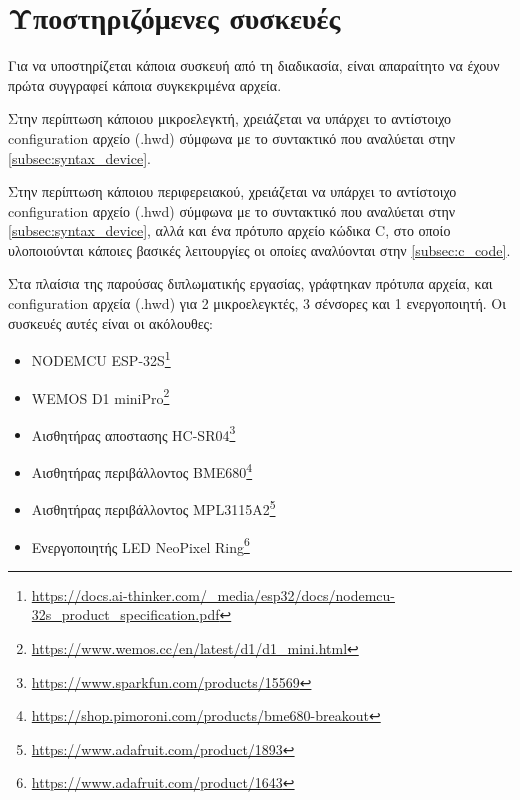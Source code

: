 \section{Υποστηριζόμενες συσκευές}
\label{sec:supported}

Για να υποστηρίζεται κάποια συσκευή από τη διαδικασία, είναι απαραίτητο να έχουν πρώτα συγγραφεί κάποια συγκεκριμένα αρχεία.

Στην περίπτωση κάποιου μικροελεγκτή, χρειάζεται να υπάρχει το αντίστοιχο configuration αρχείο (.hwd) σύμφωνα με το συντακτικό  που αναλύεται στην \autoref{subsec:syntax_device}.

Στην περίπτωση κάποιου περιφερειακού, χρειάζεται να υπάρχει το αντίστοιχο configuration αρχείο (.hwd) σύμφωνα με το συντακτικό  που αναλύεται στην \autoref{subsec:syntax_device}, αλλά και ένα πρότυπο αρχείο κώδικα C, στο οποίο υλοποιούνται κάποιες βασικές λειτουργίες οι οποίες αναλύονται στην \autoref{subsec:c_code}.

Στα πλαίσια της παρούσας διπλωματικής εργασίας, γράφτηκαν πρότυπα αρχεία, και configuration αρχεία (.hwd) για 2 μικροελεγκτές, 3 σένσορες και 1 ενεργοποιητή. Οι συσκευές αυτές είναι οι ακόλουθες:

\begin{itemize}
	\item NODEMCU ESP-32S\footnote{\url{https://docs.ai-thinker.com/_media/esp32/docs/nodemcu-32s_product_specification.pdf}}
	\item WEMOS D1 miniPro\footnote{\url{https://www.wemos.cc/en/latest/d1/d1_mini.html}}
	\item Αισθητήρας αποστασης HC-SR04\footnote{\url{https://www.sparkfun.com/products/15569}}
	\item Αισθητήρας περιβάλλοντος BME680\footnote{\url{https://shop.pimoroni.com/products/bme680-breakout}}
	\item Αισθητήρας περιβάλλοντος MPL3115A2\footnote{\url{https://www.adafruit.com/product/1893}}
	\item Ενεργοποιητής LED NeoPixel Ring\footnote{\url{https://www.adafruit.com/product/1643}}
\end{itemize}
